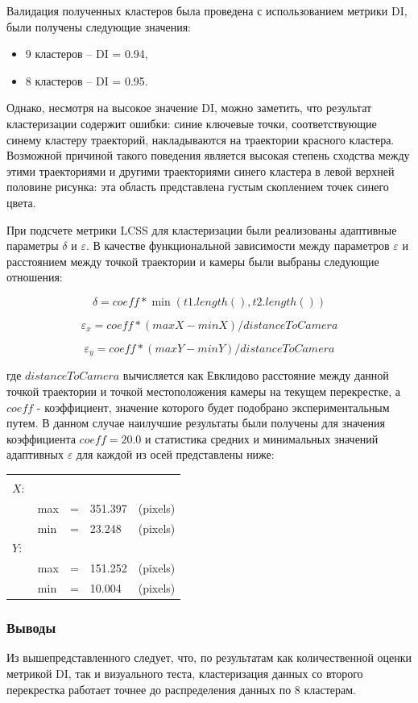 Валидация полученных кластеров была проведена с использованием метрики DI, были получены следующие значения:
\begin{itemize}
	\item 9 кластеров -- DI = 0.94,
	\item 8 кластеров -- DI = 0.95.
\end{itemize}

Однако, несмотря на высокое значение DI, можно заметить, что результат кластеризации содержит ошибки: синие ключевые точки, соответствующие синему кластеру траекторий, накладываются на траектории красного кластера. Возможной причиной такого поведения является высокая степень сходства между этими траекториями и другими траекториями синего кластера в левой верхней половине рисунка: эта область представлена густым скоплением точек синего цвета.

При подсчете метрики LCSS для кластеризации были реализованы адаптивные параметры $\delta$ и $\varepsilon$. В качестве функциональной зависимости между параметров $\varepsilon$ и расстоянием между точкой траектории и камеры были выбраны следующие отношения:

\begin{equation} \label{eq:delta-adapt}
	\delta = coeff * \min{(t1.length(), t2.length())}
\end{equation}

\begin{equation} \label{eq:epsilonX-adapt}
\varepsilon_x = coeff * (maxX - minX) / distanceToCamera
\end{equation}

\begin{equation} \label{eq:epsilonY-adapt}
\varepsilon_y = coeff * (maxY - minY) / distanceToCamera
\end{equation}

где $distanceToCamera$ вычисляется как Евклидово расстояние между данной точкой траектории и точкой местоположения камеры на текущем перекрестке, а $coeff$ - коэффициент, значение которого будет подобрано экспериментальным путем. В данном случае наилучшие результаты были получены для значения коэффициента $coeff = 20.0$ и статистика средних и минимальных значений адаптивных $\varepsilon$ для каждой из осей представлены ниже:

\begin{tabular}{lllll}
	\multicolumn{5}{c}{\bm{$\varepsilon$}}\\
	$X:$       			& & & \\[0.5ex]
						& max 	& = 	& 351.397 	& (pixels) \\[0.5ex]
						& min 	& = 	& 23.248 	& (pixels) \\[0.5ex]
	$Y:$       			& & & \\[0.5ex]
						& max 	& = 	& 151.252 	& (pixels) \\[0.5ex]
						& min 	& = 	& 10.004 	& (pixels) \\[0.5ex]

\end{tabular}

\subsubsection{Выводы}

Из вышепредставленного следует, что, по результатам как количественной оценки метрикой DI, так и визуального теста, кластеризация данных со второго перекрестка работает точнее до распределения данных по 8 кластерам.
